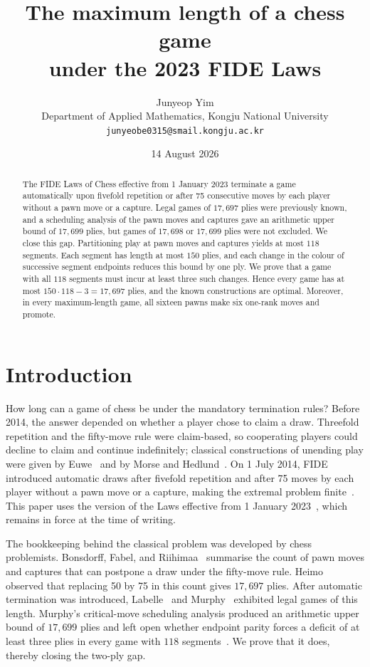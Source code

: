 \documentclass[11pt]{article}
\title{The maximum length of a chess game\\
under the 2023 FIDE Laws}
\author{Junyeop Yim\\
\small Department of Applied Mathematics, Kongju National University\\
\small \texttt{junyeobe0315@smail.kongju.ac.kr}}
\date{14 August 2026}
\theoremstyle{definition}
\begin{document}
\maketitle

\begin{abstract}
The FIDE Laws of Chess effective from 1 January 2023 terminate a game
automatically upon fivefold repetition or after 75 consecutive moves by each
player without a pawn move or a capture. Legal games of $17{,}697$ plies 
were previously known, and a scheduling analysis of the pawn
moves and captures gave an arithmetic upper bound of $17{,}699$ plies, but
games of $17{,}698$ or $17{,}699$ plies were not excluded.
We close this gap. Partitioning play at pawn moves
and captures yields at most $118$ segments. Each segment has length at most
$150$ plies, and each change in the colour of successive segment endpoints
reduces this bound by one ply. We prove that a game with all $118$ segments
must incur at least three such changes. Hence every game has at most
$150\cdot118-3=17{,}697$ plies, and the known constructions are optimal.
Moreover, in every maximum-length game, all sixteen pawns make six one-rank
moves and promote.
\end{abstract}

\section{Introduction}\label{sec:intro}

How long can a game of chess be under the mandatory termination rules? Before
2014, the answer depended on whether a player chose to claim a draw. Threefold
repetition and the fifty-move rule were claim-based, so cooperating players
could decline to claim and continue indefinitely; classical constructions of
unending play were given by Euwe~\cite{euwe1929} and by Morse and
Hedlund~\cite{morsehedlund1944}. On 1 July 2014, FIDE introduced automatic
draws after fivefold repetition and after 75 moves by each player without a
pawn move or a capture, making the extremal problem finite~\cite{fide2014laws}.
This paper uses the version of the Laws effective from 1 January
2023~\cite{fide2023laws}, which remains in force at the time of writing.

The bookkeeping behind the classical problem was developed by chess
problemists. Bonsdorff, Fabel, and Riihimaa~\cite{bonsdorff1974} summarise the
count of pawn moves and captures that can postpone a draw under the
fifty-move rule.
Heimo~\cite{heimo2004} observed that replacing 50 by 75 in this count gives
$17{,}697$ plies. After automatic termination was introduced,
Labelle~\cite{labelle2015longest} and Murphy~\cite{murphy2020longest} exhibited
legal games of this length. Murphy's critical-move scheduling analysis produced
an arithmetic upper bound of $17{,}699$ plies and left open whether endpoint
parity
forces a deficit of at least three plies in every game with $118$
segments~\cite[Secs.~2.1 and~3]{murphy2020longest}. We prove that it does,
thereby closing the two-ply gap.
\end{document}

